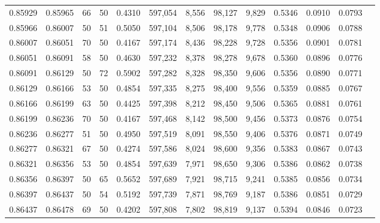 \begin{tabular}{rrrrrrrrrrrrr}
0.85929 & 0.85965 &    66 &  50 &                                     0.4310 & 597,054 &   8,556 &  98,127 &   9,829 & 0.5346 & 0.0910 & 0.0793 \\
0.85966 & 0.86007 &    50 &  51 &                                     0.5050 & 597,104 &   8,506 &  98,178 &   9,778 & 0.5348 & 0.0906 & 0.0788 \\
0.86007 & 0.86051 &    70 &  50 &                                     0.4167 & 597,174 &   8,436 &  98,228 &   9,728 & 0.5356 & 0.0901 & 0.0781 \\
0.86051 & 0.86091 &    58 &  50 &                                     0.4630 & 597,232 &   8,378 &  98,278 &   9,678 & 0.5360 & 0.0896 & 0.0776 \\
0.86091 & 0.86129 &    50 &  72 &                                     0.5902 & 597,282 &   8,328 &  98,350 &   9,606 & 0.5356 & 0.0890 & 0.0771 \\
0.86129 & 0.86166 &    53 &  50 &                                     0.4854 & 597,335 &   8,275 &  98,400 &   9,556 & 0.5359 & 0.0885 & 0.0767 \\
0.86166 & 0.86199 &    63 &  50 &                                     0.4425 & 597,398 &   8,212 &  98,450 &   9,506 & 0.5365 & 0.0881 & 0.0761 \\
0.86199 & 0.86236 &    70 &  50 &                                     0.4167 & 597,468 &   8,142 &  98,500 &   9,456 & 0.5373 & 0.0876 & 0.0754 \\
0.86236 & 0.86277 &    51 &  50 &                                     0.4950 & 597,519 &   8,091 &  98,550 &   9,406 & 0.5376 & 0.0871 & 0.0749 \\
0.86277 & 0.86321 &    67 &  50 &                                     0.4274 & 597,586 &   8,024 &  98,600 &   9,356 & 0.5383 & 0.0867 & 0.0743 \\
0.86321 & 0.86356 &    53 &  50 &                                     0.4854 & 597,639 &   7,971 &  98,650 &   9,306 & 0.5386 & 0.0862 & 0.0738 \\
0.86356 & 0.86397 &    50 &  65 &                                     0.5652 & 597,689 &   7,921 &  98,715 &   9,241 & 0.5385 & 0.0856 & 0.0734 \\
0.86397 & 0.86437 &    50 &  54 &                                     0.5192 & 597,739 &   7,871 &  98,769 &   9,187 & 0.5386 & 0.0851 & 0.0729 \\
0.86437 & 0.86478 &    69 &  50 &                                     0.4202 & 597,808 &   7,802 &  98,819 &   9,137 & 0.5394 & 0.0846 & 0.0723 \\

\end{tabular}

